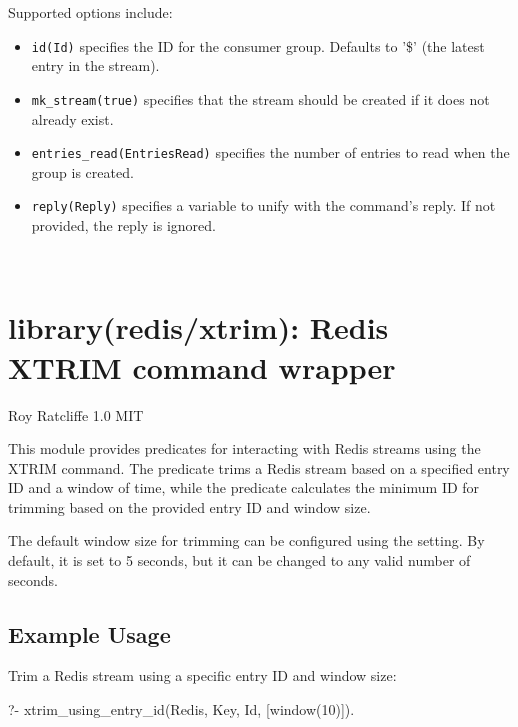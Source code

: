 \begin{description}
\begin{arguments}
Supported options include:

\begin{itemize}
    \item \verb$id(Id)$ specifies the ID for the consumer group.
Defaults to '\$' (the latest entry in the stream).
    \item \verb$mk_stream(true)$ specifies that the stream should be created
if it does not already exist.
    \item \verb$entries_read(EntriesRead)$ specifies the number of entries to read
when the group is created.
    \item \verb$reply(Reply)$ specifies a variable to unify with the command's reply.
If not provided, the reply is ignored.
\end{itemize}

 \\
\end{arguments}
\end{description}

\chapter{library(redis/xtrim): Redis XTRIM command wrapper}\label{sec:xtrim}

\begin{tags}
Roy Ratcliffe
1.0
MIT
\end{tags}

This module provides predicates for interacting with Redis streams
using the XTRIM command. The  predicate trims
a Redis stream based on a specified entry ID and a window of time,
while the  predicate calculates the minimum ID
for trimming based on the provided entry ID and window size.

The default window size for trimming can be configured using the
 setting. By default, it is set to 5 seconds, but it can be
changed to any valid number of seconds.

\section{Example Usage}

Trim a Redis stream using a specific entry ID and window size:

\begin{code}
?- xtrim_using_entry_id(Redis, Key, Id, [window(10)]).
\end{code}

